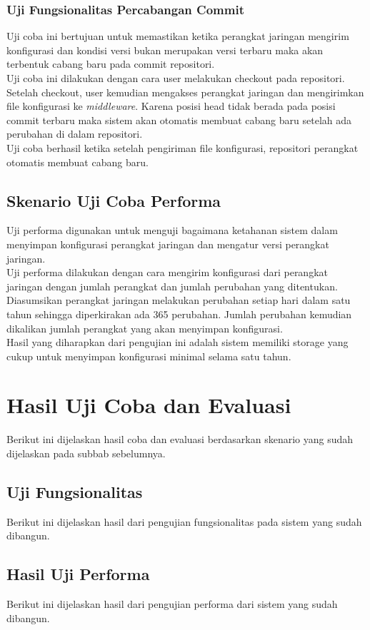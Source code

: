     	\subsubsection{Uji Fungsionalitas Percabangan Commit}
    	Uji coba ini bertujuan untuk memastikan ketika perangkat jaringan mengirim konfigurasi dan kondisi versi bukan merupakan versi terbaru maka akan terbentuk cabang baru pada commit repositori.\\
    	\indent Uji coba ini dilakukan dengan cara user melakukan checkout pada repositori. Setelah checkout, user kemudian mengakses perangkat jaringan dan mengirimkan file konfigurasi ke \textit{middleware}. Karena posisi head tidak berada pada posisi commit terbaru maka sistem akan otomatis membuat cabang baru setelah ada perubahan di dalam repositori.\\
    	Uji coba berhasil ketika setelah pengiriman file konfigurasi, repositori perangkat otomatis membuat cabang baru.
    	 
    \subsection{Skenario Uji Coba Performa}
    	Uji performa digunakan untuk menguji bagaimana ketahanan sistem dalam menyimpan konfigurasi perangkat jaringan dan mengatur versi perangkat jaringan.\\
    	\indent Uji performa dilakukan dengan cara mengirim konfigurasi dari perangkat jaringan dengan jumlah perangkat dan jumlah perubahan yang ditentukan. Diasumsikan perangkat jaringan melakukan perubahan setiap hari dalam satu tahun sehingga diperkirakan ada 365 perubahan. Jumlah perubahan kemudian dikalikan jumlah perangkat yang akan menyimpan konfigurasi. \\
    	\indent Hasil yang diharapkan dari pengujian ini adalah sistem memiliki storage yang cukup untuk menyimpan konfigurasi minimal selama satu tahun. 
    
\section{Hasil Uji Coba dan Evaluasi}
	Berikut ini dijelaskan hasil coba dan evaluasi berdasarkan skenario yang sudah dijelaskan pada subbab sebelumnya.
	
	\subsection{Uji Fungsionalitas}
	Berikut ini dijelaskan hasil dari pengujian fungsionalitas pada sistem yang sudah dibangun.
    
   	
    \subsection{Hasil Uji Performa}
    Berikut ini dijelaskan hasil dari pengujian performa dari sistem yang sudah dibangun.
    	